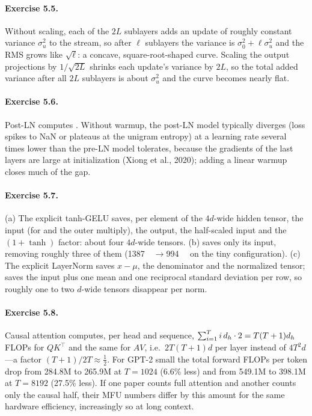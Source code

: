 \paragraph{Exercise 5.5.}
Without scaling, each of the $2L$ sublayers adds an update of roughly constant variance $\sigma_u^2$
to the stream, so after $\ell$ sublayers the variance is $\sigma_0^2+\ell\sigma_u^2$ and the RMS grows
like $\sqrt{\ell}$: a concave, square-root-shaped curve. Scaling the output projections by
$1/\sqrt{2L}$ shrinks each update's variance by $2L$, so the total added variance after all $2L$
sublayers is about $\sigma_u^2$ and the curve becomes nearly flat.

\paragraph{Exercise 5.6.}
Post-LN computes . Without warmup, the post-LN model typically diverges (loss
spikes to NaN or plateaus at the unigram entropy) at a learning rate several times lower than the
pre-LN model tolerates, because the gradients of the last layers are large at initialization
(Xiong et al., 2020); adding a linear warmup closes much of the gap.

\paragraph{Exercise 5.7.}
(a) The explicit tanh-GELU saves, per element of the $4d$-wide hidden tensor, the input (for
 and the outer multiply), the  output, the half-scaled input and the
$(1+\tanh)$ factor: about four $4d$-wide tensors. (b)  saves only its input, removing
roughly three of them (\SI{1387}{\kilo\byte}$\to$\SI{994}{\kilo\byte} on the tiny configuration).
(c) The explicit LayerNorm saves $x-\mu$, the denominator and the normalized tensor;
 saves the input plus one mean and one reciprocal standard deviation per row, so
roughly one to two $d$-wide tensors disappear per norm.

\paragraph{Exercise 5.8.}
Causal attention computes, per head and sequence, $\sum_{i=1}^{T} i\,d_{h}\cdot2 = T(T+1)d_{h}$
FLOPs for $QK^\top$ and the same for $AV$, i.e.\ $2T(T+1)d$ per layer instead of $4T^2d$---a factor
$(T+1)/2T\approx\tfrac12$. For GPT-2 small the total forward FLOPs per token drop from
\num{284.8}M to \num{265.9}M at $T=1024$ (6.6\% less) and from \num{549.1}M to \num{398.1}M at
$T=8192$ (27.5\% less). If one paper counts full attention and another counts only the causal half,
their MFU numbers differ by this amount for the same hardware efficiency, increasingly so at long
context.

